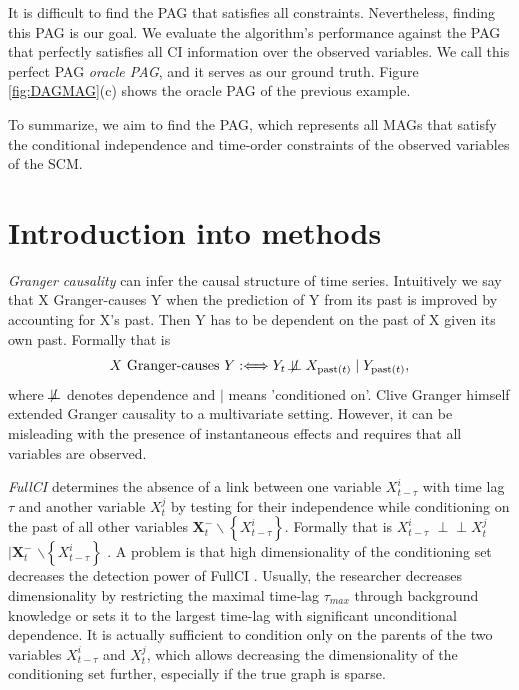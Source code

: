 \documentclass[conference]{IEEEtran}
\begin{document}
It is difficult to find the PAG that satisfies all constraints.
Nevertheless, finding this PAG is our goal. We evaluate the algorithm's performance against the PAG that perfectly satisfies all CI information over the observed variables. We call this perfect PAG \textit{oracle PAG}, and it serves as our ground truth.
Figure \ref{fig:DAGMAG}(c) shows the oracle PAG of the previous example. 

To summarize, we aim to find the PAG, which represents all MAGs that satisfy the conditional independence and time-order constraints of the observed variables of the SCM.


\section{Introduction into methods}
\textit{Granger causality} can infer the causal structure of time series. Intuitively we say that X Granger-causes Y when the prediction of Y from its past is improved by accounting for X's past.
Then Y has to be dependent on the past of X given its own past. Formally that is
\begin{equation}
X \text { Granger-causes } Y: \Longleftrightarrow Y_{t} \not\!\perp\!\!\!\perp X_{\operatorname{past}(t)}  \mid Y_{\operatorname{past}(t)},
\end{equation}
where $\not\!\perp\!\!\!\perp$ denotes dependence and $|$ means 'conditioned on'\cite[p.~204]{peters_elements_2018}.
Clive Granger himself extended Granger causality to a multivariate setting\cite{granger_testing_1980}. However, it can be misleading with the presence of instantaneous effects \cite{granger_clive_recent_1988} and requires that all variables are observed\cite{granger_testing_1980}.

\textit{FullCI} determines the absence of a link between one variable $X_{t-\tau}^{i}$ with time lag $\tau$ and another variable $X_{t}^{j}$ by testing for their independence while conditioning on the past of all other variables $\mathbf{X}_{t}^{-} \backslash\left\{X_{t-\tau}^{i}\right\}$. 
Formally that is
$X_{t-\tau}^{i} $
$\!\perp\!\!\!\perp X_{t}^{j} $
$\mid \mathbf{X}_{t}^{-}$
$ \backslash\left\{X_{t-\tau}^{i}\right\}$ \cite{runge_pcmci_2019}.
A problem is that high dimensionality of the conditioning set decreases the detection power of FullCI \cite{runge_pcmci_2019}.
Usually, the researcher decreases dimensionality by restricting the maximal time-lag $\tau_{max}$ through background knowledge or sets it to the largest time-lag with significant unconditional dependence\cite{runge_pcmci_2019}.
It is actually sufficient to condition only on the parents of the two variables $X_{t-\tau}^{i}$ and $X_{t}^{j}$\cite{pearl_causality_2000}, which allows decreasing the dimensionality of the conditioning set further, especially if the true graph is sparse.
\end{document}
